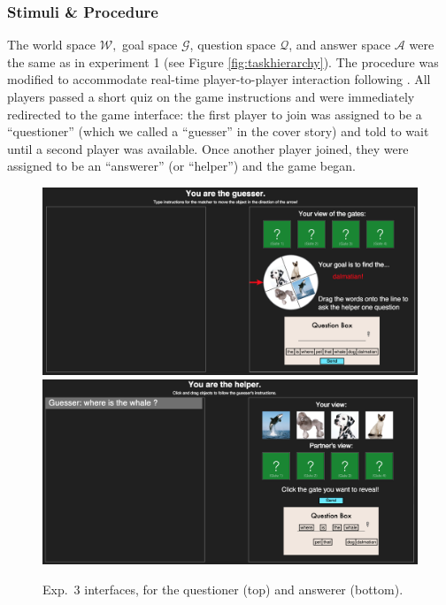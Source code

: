 \documentclass[12pt, floatsintext, jou]{apa6}
\begin{document}
\subsubsection{Stimuli \& Procedure} The world space $\mathcal{W},$ goal space $\mathcal{G}$, question space $\mathcal{Q}$, and answer space $\mathcal{A}$ were the same as in experiment 1 (see Figure \ref{fig:taskhierarchy}). The procedure was modified to accommodate real-time player-to-player interaction following . All players passed a short quiz on the game instructions and were immediately redirected to the game interface: the first player to join was assigned to be a ``questioner'' (which we called a ``guesser'' in the cover story) and told to wait until a second player was available. Once another player joined, they were assigned to be an ``answerer'' (or ``helper'') and the game began. 

	\begin{figure}[t!]
\begin{center}
\includegraphics[scale = .3]{Exp3GuesserView}
\includegraphics[scale = .3]{Exp3HelperView}
\end{center}
\caption{Exp.~3 interfaces, for the questioner (top) and answerer (bottom).}
\label{fig:exp3views}
\end{figure}
\end{document}
